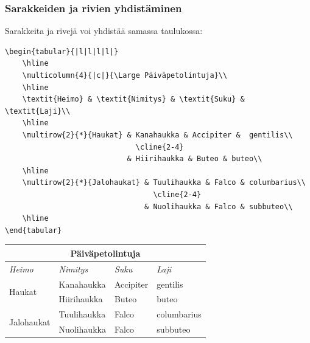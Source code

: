 \begin{frame}[fragile]
    \frametitle{Sarakkeiden ja rivien yhdistäminen} 
    Sarakkeita ja rivejä voi yhdistää samassa taulukossa:\vaihto
    \begin{minipage}{8cm}
        \begin{scriptsize}
            \begin{verbatim}
\begin{tabular}{|l|l|l|l|}
    \hline
    \multicolumn{4}{|c|}{\Large Päiväpetolintuja}\\
    \hline
    \textit{Heimo} & \textit{Nimitys} & \textit{Suku} & \textit{Laji}\\
    \hline
    \multirow{2}{*}{Haukat} & Kanahaukka & Accipiter &  gentilis\\
                              \cline{2-4}
                            & Hiirihaukka & Buteo & buteo\\
    \hline
    \multirow{2}{*}{Jalohaukat} & Tuulihaukka & Falco & columbarius\\
                                  \cline{2-4}
                                & Nuolihaukka & Falco & subbuteo\\
    \hline
\end{tabular}
            \end{verbatim}
        \end{scriptsize}
    \end{minipage}
    \begin{table}[h!]
        \begin{serif}
            \begin{scriptsize}
                \begin{tabular}{|l|l|l|l|}
                    \hline
                    \multicolumn{4}{|c|}{\Large Päiväpetolintuja}\\
                    \hline
                    \textit{Heimo} & \textit{Nimitys} & \textit{Suku} & \textit{Laji}\\\hline
                    \multirow{2}{*}{Haukat} & Kanahaukka & Accipiter &  gentilis\\ \cline{2-4}
                                            & Hiirihaukka & Buteo & buteo\\ \hline
                    \multirow{2}{*}{Jalohaukat} & Tuulihaukka & Falco & columbarius\\ \cline{2-4}
                                                &Nuolihaukka & Falco & subbuteo\\ \hline
                \end{tabular}
            \end{scriptsize}
        \end{serif}
    \end{table}

\end{frame}
